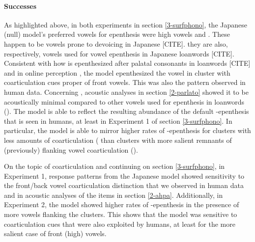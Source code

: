{\paragraph{Successes}
As highlighted above, in both experiments in section \ref{3-surfphono}, the Japanese (null) model's preferred vowels for epenthesis were high vowels  and . These happen to be vowels prone to devoicing in Japanese {\color{red}[CITE]}. they are also, respectively, vowels used for vowel epenthesis in Japanese loanwords {\color{red}[CITE]}. Consistent with how  is epenthesized after palatal consonants in loanwords {\color{red}[CITE]} and in online perception \cite{mattingley2015}, the model epenthesized the vowel  in cluster with coarticulation cues proper of front vowels. This was also the pattern observed in human data. Concerning , acoustic analyses in section \ref{2-parlato} showed it to be acoustically minimal compared to other vowels used for epenthesis in loanwords (). The model is able to reflect the resulting abundance of the default -epenthesis that is seen in humans, at least in Experiment 1 of section \ref{3-surfphono}. In particular, the model is able to mirror higher rates of -epenthesis for clusters with less amounts of coarticulation ( than clusters with more salient remnants of (previously) flanking vowel coarticulation (). 

On the topic of coarticulation and continuing on section \ref{3-surfphono}, in Experiment 1, response patterns from the Japanese model showed sensitivity to the front/back vowel coarticulation distinction that we observed in human data and in acoustic analyses of the items in section \ref{2-ahpa}. Additionally, in Experiment 2, the model showed higher rates of -epenthesis in the presence of more  vowels flanking the clusters. This shows that the model was sensitive to coarticulation cues that were also exploited by humans, at least for the more salient case of front (high) vowels.

}
